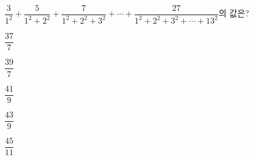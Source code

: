 \hspace*{2mm}\begin{minipage}[t]{\dimexpr\linewidth-2mm\relax}\vspace{0pt}
$\dfrac{3}{1^2}+\dfrac{5}{1^2+2^2}+\dfrac{7}{1^2+2^2+3^2}+\cdots+\dfrac{27}{1^2+2^2+3^2+\cdots+13^2}$의 값은?
\begin{choices32}{\rule[-3ex]{0pt}{8ex}$\dfrac{37}{7}$}{\rule[-3ex]{0pt}{8ex}$\dfrac{39}{7}$}{\rule[-3ex]{0pt}{8ex}$\dfrac{41}{9}$}{\rule[-3ex]{0pt}{8ex}$\dfrac{43}{9}$}{\rule[-3ex]{0pt}{8ex}$\dfrac{45}{11}$}\end{choices32}\end{minipage}
